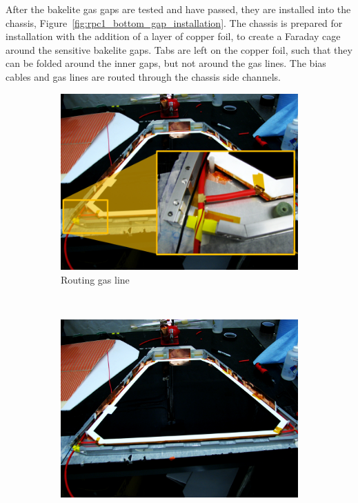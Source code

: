 After the bakelite gas gaps are tested and have passed, they are installed into
the chassis, Figure~\ref{fig:rpc1_bottom_gap_installation}. The chassis is
prepared for installation with the addition of a layer of copper foil, to create
a Faraday cage around the sensitive bakelite gaps. Tabs are left on the copper
foil, such that they can be folded around the inner gaps, but not around the gas
lines. The bias cables and gas lines are routed through the chassis side
channels.

\begin{figure}
  \centering
  \begin{subfigure}[b]{0.5\textwidth}
    \centering
    \includegraphics[width=\linewidth]{./figures/rpc1_construction_4b.jpg}
    \caption{Routing gas line}
    \label{fig:rpc1_bottom_gas_line_detail}
  \end{subfigure}%
  ~
  \begin{subfigure}[b]{0.5\textwidth}
    \centering
    \includegraphics[width=\linewidth]{./figures/rpc1_construction_4.jpg}

\end{subfigure}
\end{figure}
